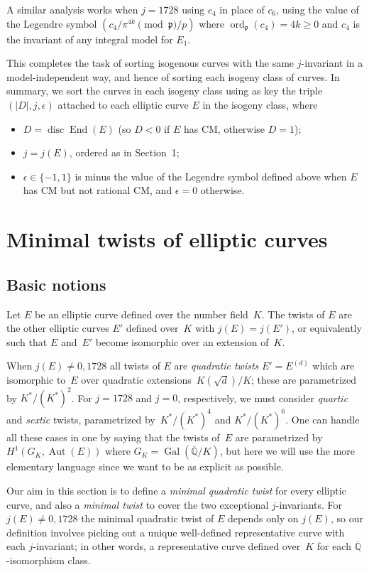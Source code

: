 \documentclass{article}
\theoremstyle{remark}
\def\Q{{\mathbb Q}}
\def\p{{\mathfrak p}}
\def\Qbar{\overline{\Q}}
\DeclareMathOperator{\disc}{disc}
\DeclareMathOperator{\ord}{ord}
\DeclareMathOperator{\Gal}{Gal}
\DeclareMathOperator{\End}{End}
\DeclareMathOperator{\Aut}{Aut}
\begin{document}
A similar analysis works when $j=1728$ using $c_4$ in place of $c_6$,
using the value of the Legendre symbol $(c_4/\pi^{4k}\pmod{\p}/p)$
where $\ord_{\p}(c_4)=4k\ge0$ and $c_4$ is the invariant of any
integral model for $E_1$.

This completes the task of sorting isogenous curves with the same
$j$-invariant in a model-independent way, and hence of sorting each
isogeny class of curves.  In summary, we sort the curves in each
isogeny class using as key the triple $(|D|,j,\epsilon)$ attached to
each elliptic curve $E$ in the isogeny class, where
\begin{itemize}
\item $D=\disc\End(E)$ (so $D<0$ if $E$ has CM, otherwise $D=1$);
\item $j=j(E)$, ordered as in Section~1;
\item $\epsilon\in\{-1,1\}$ is minus the value of the Legendre symbol
  defined above when $E$ has CM but not rational CM, and $\epsilon=0$
  otherwise.
\end{itemize}

\section{Minimal twists of elliptic curves}

\subsection{Basic notions}
Let $E$ be an elliptic curve defined over the number field~$K$.  The
twists of $E$ are the other elliptic curves $E'$ defined over~$K$ with
$j(E)=j(E')$, or equivalently such that $E$ and~$E'$ become isomorphic
over an extension of~$K$.

When $j(E)\not=0,1728$ all twists of $E$ are \textit{quadratic twists}
$E'=E^{(d)}$ which are isomorphic to~$E$ over quadratic
extensions~$K(\sqrt{d})/K$; these are parametrized by $K^*/(K^*)^2$.
For $j=1728$ and $j=0$, respectively, we must consider
\textit{quartic} and \textit{sextic} twists, parametrized
by~$K^*/(K^*)^4$ and $K^*/(K^*)^6$.  One can handle all these cases in
one by saying that the twists of~$E$ are parametrized by
$H^1(G_K,\Aut(E))$ where $G_K=\Gal(\Qbar/K)$, but here we will use the
more elementary language since we want to be as explicit as possible.

Our aim in this section is to define a \textit{minimal quadratic
  twist} for every elliptic curve, and also a \textit{minimal twist}
to cover the two exceptional $j$-invariants.  For $j(E)\not=0,1728$
the minimal quadratic twist of $E$ depends only on $j(E)$, so our
definition involves picking out a unique well-defined representative
curve with each $j$-invariant; in other words, a representative curve
defined over~$K$ for each $\Qbar$-isomorphism class.
\end{document}
